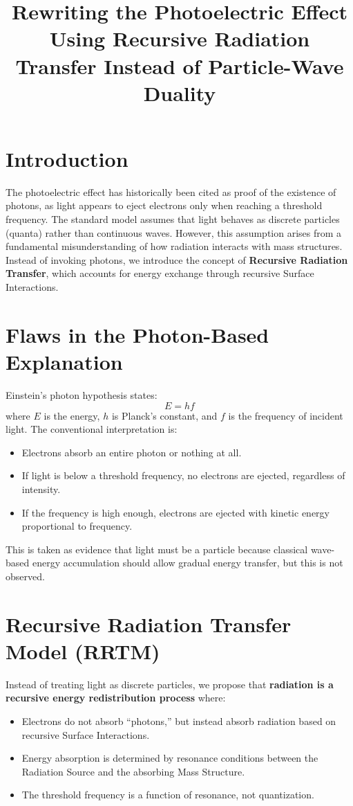 \documentclass{article}
\title{Rewriting the Photoelectric Effect Using Recursive Radiation Transfer Instead of Particle-Wave Duality}
\author{}
\date{}
\begin{document}
\maketitle

\section{Introduction}
The photoelectric effect has historically been cited as proof of the existence of photons, as light appears to eject electrons only when reaching a threshold frequency. The standard model assumes that light behaves as discrete particles (quanta) rather than continuous waves. However, this assumption arises from a fundamental misunderstanding of how radiation interacts with mass structures. Instead of invoking photons, we introduce the concept of \textbf{Recursive Radiation Transfer}, which accounts for energy exchange through recursive Surface Interactions.

\section{Flaws in the Photon-Based Explanation}
Einstein's photon hypothesis states:
\begin{equation}
    E = h f
\end{equation}
where $E$ is the energy, $h$ is Planck’s constant, and $f$ is the frequency of incident light. The conventional interpretation is:
\begin{itemize}
    \item Electrons absorb an entire photon or nothing at all.
    \item If light is below a threshold frequency, no electrons are ejected, regardless of intensity.
    \item If the frequency is high enough, electrons are ejected with kinetic energy proportional to frequency.
\end{itemize}
This is taken as evidence that light must be a particle because classical wave-based energy accumulation should allow gradual energy transfer, but this is not observed.

\section{Recursive Radiation Transfer Model (RRTM)}
Instead of treating light as discrete particles, we propose that \textbf{radiation is a recursive energy redistribution process} where:
\begin{itemize}
    \item Electrons do not absorb ``photons,'' but instead absorb radiation based on recursive Surface Interactions.
    \item Energy absorption is determined by resonance conditions between the Radiation Source and the absorbing Mass Structure.
    \item The threshold frequency is a function of resonance, not quantization.
\end{itemize}
\end{document}
